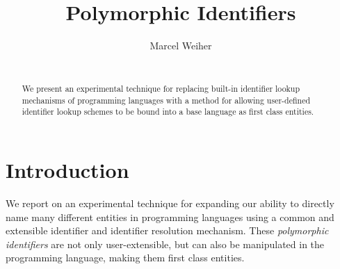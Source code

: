 \documentclass[preprint,authoryear]{acm_proc_article-sp}
\begin{document}


\title{Polymorphic Identifiers}

\author{
\alignauthor Marcel Weiher\\
       \\
}

\maketitle

\begin{abstract}
We present an experimental technique for replacing built-in identifier lookup mechanisms
of programming languages with a method for allowing user-defined identifier lookup schemes
to be bound into a base language as first class entities.  


\end{abstract}


\setlength{\epigraphrule}{0pt}


\section{Introduction}

We report on an experimental
technique for expanding our ability to directly name many different 
entities
in programming languages using a common and extensible identifier and identifier resolution
mechanism.
These \emph{polymorphic identifiers} are not only user-extensible,
but can also be manipulated in the programming language, making them first class 
entities.
\end{document}
